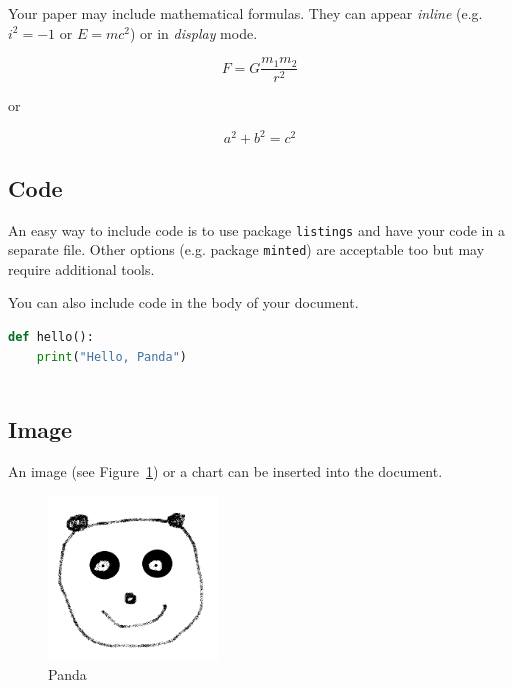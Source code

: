 \documentclass[nonacm]{acmart}
\begin{document}
Your paper may include mathematical formulas. They can appear \emph{inline} (e.g. \begin{math}i^2=-1\end{math} or \(E=mc^2\)) or in \emph{display} mode.

\begin{equation}
    F = G \frac{m_1 m_2}{r^2}
\end{equation}

or

\[a^2 + b^2 = c^2\]

\subsection{Code}

An easy way to include code is to use package \texttt{listings} and have your code in a separate file. Other options (e.g. package \texttt{minted}) are acceptable too but may require additional tools.



\noindent You can also include code in the body of your document.

\begin{lstlisting}[language=Python, caption=\texttt{hello} inline and with different options, captionpos=b, frame=trbl, showstringspaces=false]
def hello():
    print("Hello, Panda")
    
\end{lstlisting}

\subsection{Image}

An image (see Figure~\ref{fig:panda}) or a chart can be inserted into the document.

\begin{figure}[!htbp]
    \centering
    \includegraphics[width=0.4\textwidth]{panda.png}
    \caption{Panda}
    \label{fig:panda}
\end{figure}
\end{document}
